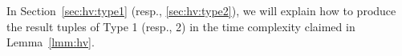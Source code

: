 \documentclass[sigconf]{acmart}
\def\vgap{\vspace{1mm}}
\begin{document}
\vgap 

In Section~\ref{sec:hv:type1} (resp., \ref{sec:hv:type2}), we will explain how to produce the result tuples of Type 1 (resp., 2) in the time complexity claimed in Lemma~\ref{lmm:hv}.



\vgap 
%
%
%
\end{document}
